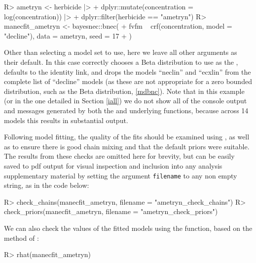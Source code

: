 \documentclass[
  shortnames]{jss}
\begin{document}
\begin{CodeChunk}
\begin{CodeInput}
R> ametryn <- herbicide |>
+   dplyr::mutate(concentration = log(concentration)) |> 
+   dplyr::filter(herbicide == "ametryn")
R> manecfit_ametryn <- bayesnec::bnec(
+   fvfm ~ crf(concentration, model = "decline"), data = ametryn, seed = 17
+ )
\end{CodeInput}
\end{CodeChunk}

Other than selecting a model set to use, here we leave all other  arguments as their default. In this case  correctly chooses a Beta distribution to use as the , defaults to the identity link, and drops the models ``neclin'' and ``ecxlin'' from the complete list of ``decline'' models (as these are not appropriate for a zero bounded distribution, such as the Beta distribution, \ref{mdbnc}). Note that in this example (or in the one detailed in Section \ref{iall}) we do not show all of the console output and messages generated by both the  and underlying  functions, because across 14 models this results in substantial output.

Following model fitting, the quality of the fits should be examined using , as well as  to ensure there is good chain mixing and that the default priors were suitable. The results from these checks are omitted here for brevity, but can be easily saved to pdf output for visual inspection and inclusion into any analysis supplementary material by setting the argument \texttt{filename} to any non empty string, as in the code below:

\begin{CodeChunk}
\begin{CodeInput}
R> check_chains(manecfit_ametryn, filename = "ametryn_check_chains")
R> check_priors(manecfit_ametryn, filename = "ametryn_check_priors")
\end{CodeInput}
\end{CodeChunk}

We can also check the  values of the fitted models using the  function, based on the method of \citet{vehtari2021rank}:

\begin{CodeChunk}
\begin{CodeInput}
R> rhat(manecfit_ametryn)
\end{CodeInput}
\end{CodeChunk}
\end{document}

